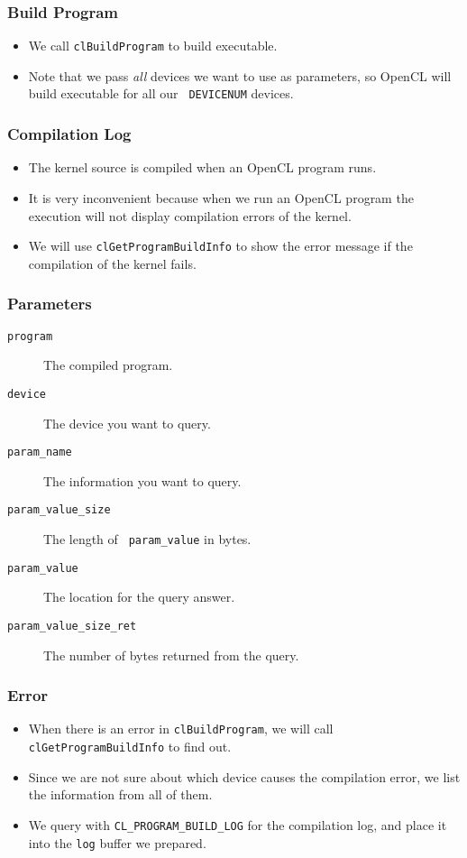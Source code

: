 \documentclass{beamer}
\begin{document}
\begin{frame}
  \frametitle{Build Program}
  \begin{itemize}
    \item We call {\tt clBuildProgram} to build executable.
    \item Note that we pass {\em all} devices we want to use as
      parameters, so OpenCL will build executable for all our {\tt
        DEVICENUM} devices.
  \end{itemize}
\end{frame}

\begin{frame}
  \frametitle{Compilation Log}
  \begin{itemize}
    \item The kernel source is compiled when an OpenCL program runs.
    \item It is very inconvenient because when we run an OpenCL program
      the execution will not display compilation errors of the kernel.
    \item We will use {\tt clGetProgramBuildInfo} to show the error
      message if the compilation of the kernel fails.
  \end{itemize}
\end{frame}

\begin{frame}
\end{frame}

\begin{frame}
  \frametitle{Parameters}
  \begin{description}
  \item [\tt program] The compiled program.
  \item [\tt device] The device you want to query.
  \item [\tt param\_name] The information you want to query.
    \item [\tt \tt param\_value\_size] The length of {\tt
      param\_value} in bytes.
  \item [\tt param\_value] The location for the query answer.
  \item [\tt param\_value\_size\_ret] The number of bytes returned
    from the query.
  \end{description}
\end{frame}

\begin{frame}
  \frametitle{Error}
  \begin{itemize}
    \item When there is an error in {\tt clBuildProgram}, we will call
      {\tt clGetProgramBuildInfo} to find out.
    \item Since we are not sure about which device causes the
      compilation error, we list the information from all of them.
    \item We query with {\tt CL\_PROGRAM\_BUILD\_LOG} for the
      compilation log, and place it into the {\tt log} buffer we
      prepared.
  \end{itemize}
\end{frame}
\end{document}
